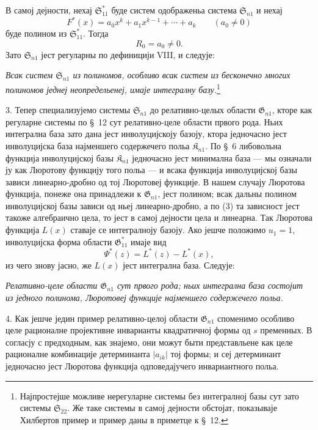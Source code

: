 ﻿\documentclass[11pt]{article}
\providecommand{\Kfield}{\mathfrak{K}}
\providecommand{\Ssys}{\mathfrak{S}}
\providecommand{\Gdom}{\mathfrak{G}}
\begin{document}
В самој дејности, нехај $\Ssys^*_{11}$ буде систем одображеньа система $\Ssys_{n1}$ и нехај
\[
  F^*(x)=a_0x^k+a_1x^{k-1}+\cdots+a_k\qquad(a_0\ne0)
\]
буде полином из $\Ssys^*_{11}$. Тогда
\begin{equation}
  R_0=a_0\ne0.
\tag{3}
\end{equation}
Зато $\Ssys_{n1}$ јест регуларны по дефиницији VIII, и следује:

{\itshape Всак систем $\Ssys_{n1}$ из полиномов, особливо всак систем из бесконечно многих полиномов једнеј неопредельенеј, имаје интегралну базу.}\footnote{Најпростејше можливе нерегуларне системы без интегралној базы сут зато системы $\Ssys_{22}$. Же таке системы в самој дејности обстојат, показываје Хилбертов пример и пример даны в приметце к \S\ 12.}

3. Тепер специализујемо системы $\Ssys_{n1}$ до релативно-целых области $\Gdom_{n1}$, кторе как регуларне системы по \S\ 12 сут релативно-целе области првого рода. Ньих интегрална база зато дана јест инволуцијскоју базоју, ктора једночасно јест инволуцијска база најменшего содержечего польа $\Kfield_{n1}$. По \S\ 6 либовольна функција инволуцијској базы $\Kfield_{n1}$ једночасно јест минимална база --- мы означали ју как Люротову функцију того польа --- и всака функција инволуцијској базы зависи линеарно-дробно од тој Люротовеј функције. В нашем случају Люротова функција, понеже она принадлежи к $\Gdom_{n1}$, јест полином; всак дальны полином инволуцијској базы зависи од ньеј линеарно-дробно, а по (3) та зависност јест такоже алгебраично цела, то јест в самој дејности цела и линеарна. Так Люротова функција $L(x)$ ставаје се интегралноју базоју. Ако јешче положимо $u_1=1$, инволуцијска форма области $\Gdom^*_{11}$ имаје вид
\[
  \Psi^*(z)=L^*(z)-L^*(x),
\]
из чего знову јасно, же $L(x)$ јест интегрална база. Следује:

{\itshape Релативно-целе области $\Gdom_{n1}$ сут првого рода; ньих интегрална база состојит из једного полинома, Люротовеј функције најменшего содержечего польа.}

4. Как јешче једин пример релативно-целој области $\Gdom_{n1}$ споменимо особливо целе рационалне пројективне инварианты квадратичној формы од $s$ пременных. В согласју с предходным, как знајемо, они можут быти представльене как целе рационалне комбинације детерминанта $|a_{ik}|$ тој формы; и сеј детерминант једночасно јест Люротова функција одповедајучего инвариантного польа.
\end{document}
